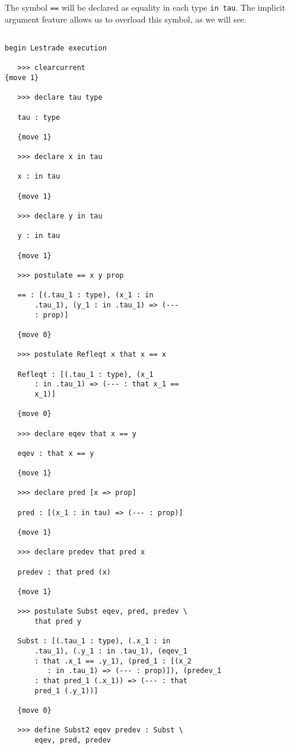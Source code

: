 \documentclass[12pt]{article}
\begin{document}
The symbol {\tt ==} will be declared as equality in each type {\tt in tau}.  The implicit argument feature allows us to overload this symbol, as we will see.

\begin{verbatim}

begin Lestrade execution

   >>> clearcurrent
{move 1}

   >>> declare tau type

   tau : type

   {move 1}

   >>> declare x in tau

   x : in tau

   {move 1}

   >>> declare y in tau

   y : in tau

   {move 1}

   >>> postulate == x y prop

   == : [(.tau_1 : type), (x_1 : in 
       .tau_1), (y_1 : in .tau_1) => (--- 
       : prop)]

   {move 0}

   >>> postulate Refleqt x that x == x

   Refleqt : [(.tau_1 : type), (x_1 
       : in .tau_1) => (--- : that x_1 == 
       x_1)]

   {move 0}

   >>> declare eqev that x == y

   eqev : that x == y

   {move 1}

   >>> declare pred [x => prop]

   pred : [(x_1 : in tau) => (--- : prop)]

   {move 1}

   >>> declare predev that pred x

   predev : that pred (x)

   {move 1}

   >>> postulate Subst eqev, pred, predev \
       that pred y

   Subst : [(.tau_1 : type), (.x_1 : in 
       .tau_1), (.y_1 : in .tau_1), (eqev_1 
       : that .x_1 == .y_1), (pred_1 : [(x_2 
          : in .tau_1) => (--- : prop)]), (predev_1 
       : that pred_1 (.x_1)) => (--- : that 
       pred_1 (.y_1))]

   {move 0}

   >>> define Subst2 eqev predev : Subst \
       eqev, pred, predev


\end{verbatim}
\end{document}
